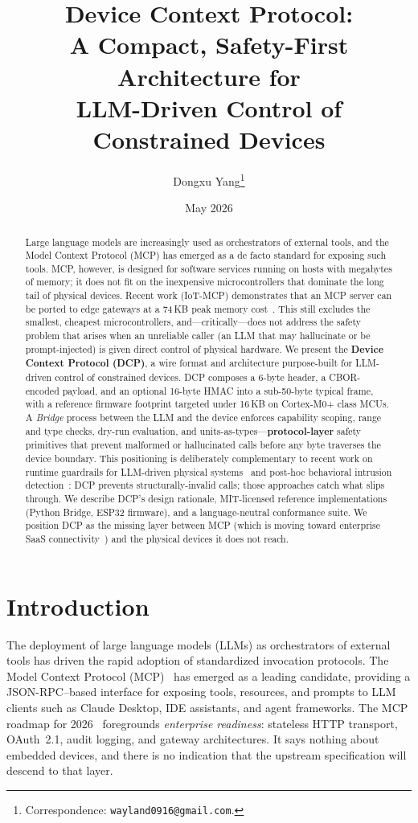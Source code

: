 \documentclass[11pt,a4paper]{article}
\title{\vspace{-2em}\textbf{Device Context Protocol:}\\
  \large A Compact, Safety-First Architecture for\\
  LLM-Driven Control of Constrained Devices}
\author[1]{Dongxu Yang\thanks{Correspondence: \texttt{wayland0916@gmail.com}.}}
\affil[1]{DeepLethe}
\date{May 2026}
\begin{document}
\maketitle

\begin{abstract}
\noindent
Large language models are increasingly used as orchestrators of external tools,
and the Model Context Protocol (MCP) has emerged as a de facto standard for
exposing such tools. MCP, however, is designed for software services running
on hosts with megabytes of memory; it does not fit on the inexpensive
microcontrollers that dominate the long tail of physical devices. Recent work
(IoT-MCP) demonstrates that an MCP server can be ported to edge gateways at a
74\,KB peak memory cost~\cite{iotmcp2025}. This still excludes the smallest,
cheapest microcontrollers, and---critically---does not address the safety
problem that arises when an unreliable caller (an LLM that may hallucinate or
be prompt-injected) is given direct control of physical hardware. We present
the \textbf{Device Context Protocol (DCP)}, a wire format and architecture
purpose-built for LLM-driven control of constrained devices. DCP composes a
6-byte header, a CBOR-encoded payload, and an optional 16-byte HMAC into a
sub-50-byte typical frame, with a reference firmware footprint targeted under
16\,KB on Cortex-M0+ class MCUs. A \emph{Bridge} process between the LLM and
the device enforces capability scoping, range and type checks, dry-run
evaluation, and units-as-types---\textbf{protocol-layer} safety primitives
that prevent malformed or hallucinated calls before any byte traverses the
device boundary. This positioning is deliberately complementary to recent
work on runtime guardrails for LLM-driven physical systems~\cite{web_of_drones,robosafe}
and post-hoc behavioral intrusion detection~\cite{aegismcp}: DCP prevents
structurally-invalid calls; those approaches catch what slips through. We
describe DCP's design rationale, MIT-licensed reference implementations
(Python Bridge, ESP32 firmware), and a language-neutral conformance suite.
We position DCP as the missing layer between MCP (which is moving toward
enterprise SaaS connectivity~\cite{mcp_roadmap_2026}) and the physical
devices it does not reach.
\end{abstract}

\section{Introduction}

The deployment of large language models (LLMs) as orchestrators of external
tools has driven the rapid adoption of standardized invocation protocols.
The Model Context Protocol (MCP)~\cite{mcp2024} has emerged as a leading
candidate, providing a JSON-RPC--based interface for exposing tools, resources,
and prompts to LLM clients such as Claude Desktop, IDE assistants, and agent
frameworks. The MCP roadmap for 2026~\cite{mcp_roadmap_2026} foregrounds
\emph{enterprise readiness}: stateless HTTP transport, OAuth~2.1,
audit logging, and gateway architectures. It says nothing about embedded
devices, and there is no indication that the upstream specification will
descend to that layer.
\end{document}
